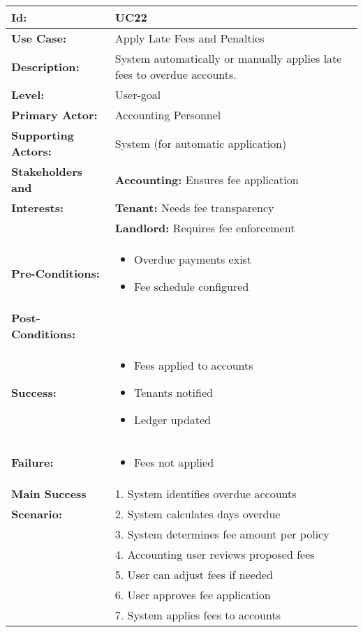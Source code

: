 \documentclass[12pt]{article}
\begin{document}
\begin{tabular}{|p{3cm}|p{11cm}|}
\hline
\textbf{Id:} & UC22 \\
\hline
\textbf{Use Case:} & Apply Late Fees and Penalties \\
\hline
\textbf{Description:} & System automatically or manually applies late fees to overdue accounts. \\
\hline
\textbf{Level:} & User-goal \\
\hline
\textbf{Primary Actor:} & Accounting Personnel \\
\hline
\textbf{Supporting Actors:} & System (for automatic application) \\
\hline
\textbf{Stakeholders and} & \textbf{Accounting:} Ensures fee application \\
\textbf{Interests:} & \textbf{Tenant:} Needs fee transparency \\
& \textbf{Landlord:} Requires fee enforcement \\
\hline
\textbf{Pre-Conditions:} & 
\begin{itemize}
    \item Overdue payments exist
    \item Fee schedule configured
\end{itemize} \\
\hline
\textbf{Post-Conditions:} & \\
\textbf{Success:} & 
\begin{itemize}
    \item Fees applied to accounts
    \item Tenants notified
    \item Ledger updated
\end{itemize} \\
\textbf{Failure:} & 
\begin{itemize}
    \item Fees not applied
\end{itemize} \\
\hline
\textbf{Main Success} & 1. System identifies overdue accounts \\
\textbf{Scenario:} & 2. System calculates days overdue \\
& 3. System determines fee amount per policy \\
& 4. Accounting user reviews proposed fees \\
& 5. User can adjust fees if needed \\
& 6. User approves fee application \\
& 7. System applies fees to accounts \\

\end{tabular}
\end{document}
